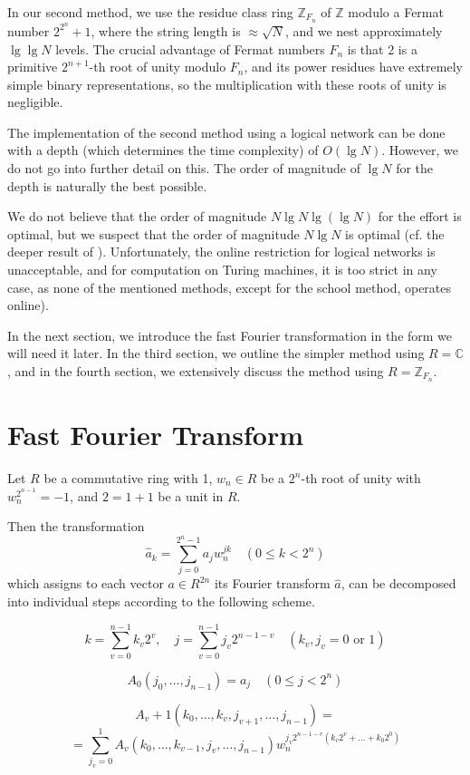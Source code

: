 \documentclass{article}
\begin{document}
In our second method, we use the residue class ring $\mathbb{Z}_{F_n}$ of $\mathbb{Z}$ modulo a Fermat number $2^{2^n} + 1$, where the string length is $\approx \sqrt{N}$, and we nest approximately $\lg \lg N$ levels. The crucial advantage of Fermat numbers $F_n$ is that 2 is a primitive $2^{n+1}$-th root of unity modulo $F_n$, and its power residues have extremely simple binary representations, so the multiplication with these roots of unity is negligible.

The implementation of the second method using a logical network can be done with a depth (which determines the time complexity) of $O(\lg N)$. However, we do not go into further detail on this. The order of magnitude of $\lg N$ for the depth is naturally the best possible.

We do not believe that the order of magnitude $N \lg N \lg(\lg N)$ for the effort is optimal, but we suspect that the order of magnitude $N \lg N$ is optimal (cf. the deeper result of \cite{cook2}). Unfortunately, the online restriction for logical networks is unacceptable, and for computation on Turing machines, it is too strict in any case, as none of the mentioned methods, except for the school method, operates online).

In the next section, we introduce the fast Fourier transformation in the form we will need it later. In the third section, we outline the simpler method using $R = \mathbb{C}$, and in the fourth section, we extensively discuss the method using $R = \mathbb{Z}_{F_n}$.

\section{Fast Fourier Transform}
Let $R$ be a commutative ring with 1, $w_n \in R$ be a $2^n$-th root of unity with $w_n^{2^{n - 1}} = -1$, and $2 = 1 + 1$ be a unit in $R$.

Then the transformation
\[
\tag{2.1}
\hat{a}_k = \sum_{j = 0}^{2^n - 1} a_j w_n^{jk} \quad (0 \le k < 2^n)
\]
which assigns to each vector $a \in R^{2n}$ its Fourier transform $\hat{a}$, can be decomposed into individual steps according to the following scheme.

\[
\tag{2.2}
k = \sum_{v = 0}^{n - 1} k_v 2^v, \quad j = \sum_{v = 0}^{n - 1} j_v 2^{n - 1 - v} \quad (k_v, j_v = 0\text{ or }1)
\]

\[
\tag{2.3}
A_0 (j_0, \ldots, j_{n - 1}) = a_j \quad (0 \le j < 2^n)
\]

\[
A_v + 1 (k_0, \ldots, k_v, j_{v + 1}, \ldots, j_{n - 1}) =
\]
\[
\tag{2.4}
= \sum_{j_v = 0}^1 A_v (k_0, \ldots, k_{v - 1}, j_v, \ldots, j_{n - 1}) w_n^{j_v 2^{n - 1 - v} (k_v 2^v + \ldots + k_0 2^0)}
\]
\end{document}
